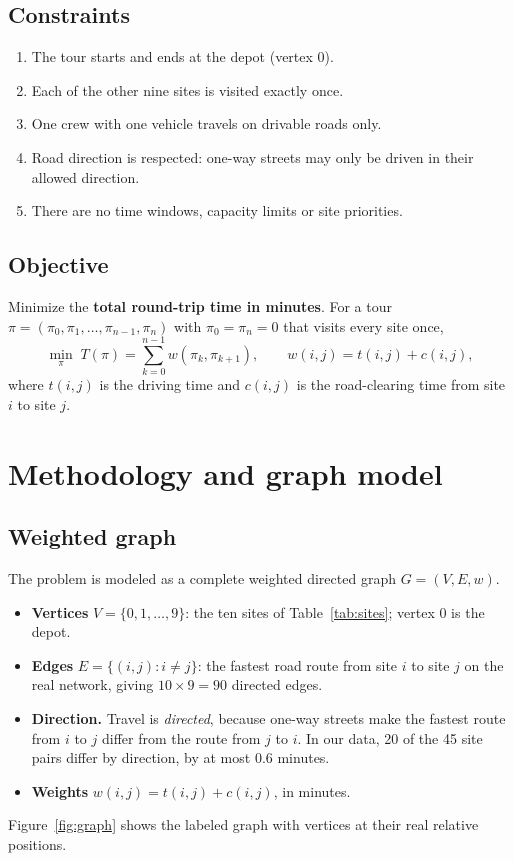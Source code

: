\documentclass[11pt,a4paper]{article}
\begin{document}
\subsection{Constraints}
\begin{enumerate}[noitemsep]
  \item The tour starts and ends at the depot (vertex 0).
  \item Each of the other nine sites is visited exactly once.
  \item One crew with one vehicle travels on drivable roads only.
  \item Road direction is respected: one-way streets may only be driven in their allowed direction.
  \item There are no time windows, capacity limits or site priorities.
\end{enumerate}

\subsection{Objective}
Minimize the \textbf{total round-trip time in minutes}. For a tour $\pi = (\pi_0, \pi_1, \dots, \pi_{n-1}, \pi_n)$ with $\pi_0 = \pi_n = 0$ that visits every site once,
\begin{equation}
  \min_{\pi} \; T(\pi) = \sum_{k=0}^{n-1} w(\pi_k, \pi_{k+1}), \qquad w(i,j) = t(i,j) + c(i,j),
\end{equation}
where $t(i,j)$ is the driving time and $c(i,j)$ is the road-clearing time from site $i$ to site $j$.

\section{Methodology and graph model}\label{sec:model}
\subsection{Weighted graph}
The problem is modeled as a complete weighted directed graph $G = (V, E, w)$.
\begin{itemize}[noitemsep]
  \item \textbf{Vertices} $V = \{0, 1, \dots, 9\}$: the ten sites of Table~\ref{tab:sites}; vertex 0 is the depot.
  \item \textbf{Edges} $E = \{(i,j) : i \neq j\}$: the fastest road route from site $i$ to site $j$ on the real network, giving $10 \times 9 = 90$ directed edges.
  \item \textbf{Direction.} Travel is \emph{directed}, because one-way streets make the fastest route from $i$ to $j$ differ from the route from $j$ to $i$. In our data, 20 of the 45 site pairs differ by direction, by at most 0.6 minutes.
  \item \textbf{Weights} $w(i,j) = t(i,j) + c(i,j)$, in minutes.
\end{itemize}
Figure~\ref{fig:graph} shows the labeled graph with vertices at their real relative positions.
\end{document}
